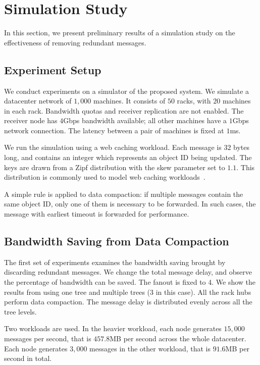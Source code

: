 \section{Simulation Study}\label{sec:eval}

In this section, we present preliminary results of a simulation study on the
effectiveness of removing redundant messages.

\subsection{Experiment Setup}

We conduct experiments on a simulator of the proposed system.  We simulate a
datacenter network of $1,000$ machines.  It consists of $50$ racks, with $20$
machines in each rack.  Bandwidth quotas and receiver replication are not
enabled.  The receiver node has $4$Gbps bandwidth available; all other machines
have a $1$Gbps network connection.  The latency between a pair of machines is
fixed at $1$ms.

We run the simulation using a web caching workload.  Each message is $32$ bytes
long, and contains an integer which represents an object ID being updated.  The
keys are drawn from a Zipf distribution with the skew parameter set to $1.1$.
This distribution is commonly used to model web caching
workloads~\cite{BCFPS99, CSTRS10, HBvRLKL13}.

A simple rule is applied to data compaction: if multiple messages contain the
same object ID, only one of them is necessary to be forwarded.  In such cases,
the message with earliest timeout is forwarded for performance.

\subsection{Bandwidth Saving from Data Compaction}

The first set of experiments examines the bandwidth saving brought by
discarding redundant messages.  We change the total message delay, and
observe the percentage of bandwidth can be saved.  The fanout is fixed to 4.
We show the results from using one tree and multiple trees ($3$ in this case).
All the rack hubs perform data compaction.  The message delay is distributed
evenly across all the tree levels.

Two workloads are used.  In the heavier workload, each node generates $15,000$
messages per second, that is $457.8$MB per second across the whole datacenter.
Each node generates $3,000$ messages in the other workload, that is $91.6$MB
per second in total.

